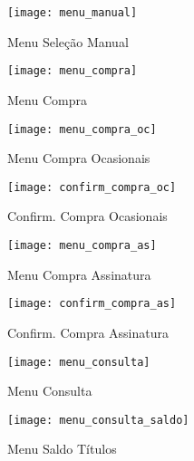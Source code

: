 \begin{figure}[ht]
\begin{minipage}[b]{0.45\linewidth}
\centering
\texttt{[image: menu\_manual]}
    \caption{Menu Seleção Manual}
    \label{fig:menu_manual}
\end{minipage}
\hspace{0.5cm}
\begin{minipage}[b]{0.45\linewidth}
\centering
    \texttt{[image: menu\_compra]}
    \caption{Menu Compra}
    \label{fig:menu_compra}
\end{minipage}
\end{figure}

\begin{figure}[ht]
\begin{minipage}[b]{0.45\linewidth}
\centering
\texttt{[image: menu\_compra\_oc]}
    \caption{Menu Compra Ocasionais}
    \label{fig:menu_compra_oc}
\end{minipage}
\hspace{0.5cm}
\begin{minipage}[b]{0.45\linewidth}
\centering
    \texttt{[image: confirm\_compra\_oc]}
    \caption{Confirm. Compra Ocasionais}
    \label{fig:confirm_compra_oc}
\end{minipage}
\end{figure}

\begin{figure}[ht]
\begin{minipage}[b]{0.45\linewidth}
\centering
\texttt{[image: menu\_compra\_as]}
    \caption{Menu Compra Assinatura}
    \label{fig:menu_compra_as}
\end{minipage}
\hspace{0.5cm}
\begin{minipage}[b]{0.45\linewidth}
\centering
    \texttt{[image: confirm\_compra\_as]}
    \caption{Confirm. Compra Assinatura}
    \label{fig:confirm_compra_as}
\end{minipage}
\end{figure}

\begin{figure}[ht]
\begin{minipage}[b]{0.45\linewidth}
\centering
\texttt{[image: menu\_consulta]}
    \caption{Menu Consulta}
    \label{fig:menu_consulta}
\end{minipage}
\hspace{0.5cm}
\begin{minipage}[b]{0.45\linewidth}
\centering
    \texttt{[image: menu\_consulta\_saldo]}
    \caption{Menu Saldo Títulos}
    \label{fig:menu_consulta_saldo}
\end{minipage}
\end{figure}

